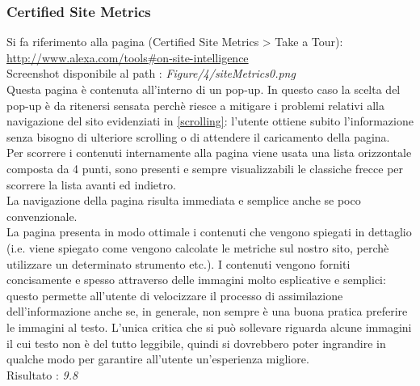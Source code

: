 \subsubsection{Certified Site Metrics}\label{metrics}
Si fa riferimento alla pagina (Certified Site Metrics > Take a Tour): \\
\url{http://www.alexa.com/tools#on-site-intelligence}
\\
Screenshot disponibile al path : \textit{Figure/4/siteMetrics0.png} \\ 
Questa pagina è contenuta all'interno di un pop-up.
In questo caso la scelta del pop-up è da ritenersi sensata perchè riesce a 
mitigare i problemi relativi alla navigazione del sito evidenziati in 
\ref{scrolling}: l'utente ottiene subito l'informazione senza
bisogno di ulteriore scrolling o di attendere il caricamento della pagina.\\
Per scorrere i contenuti internamente alla pagina viene usata una lista
 orizzontale composta da 4 punti, sono presenti e sempre
visualizzabili le classiche frecce per scorrere la lista avanti ed indietro. \\
La navigazione della pagina risulta immediata e semplice anche se poco
convenzionale. \\
La pagina presenta in modo ottimale i contenuti che vengono spiegati in 
dettaglio (i.e. viene spiegato come vengono calcolate le metriche sul
nostro sito, perchè utilizzare un determinato strumento etc.). I contenuti vengono
forniti concisamente e spesso attraverso delle immagini molto esplicative e
semplici: questo permette all'utente di velocizzare il processo di assimilazione
dell'informazione anche se, in generale, non sempre è una buona pratica 
preferire le immagini al testo. L'unica critica che si può sollevare riguarda
alcune immagini il cui testo non è del tutto leggibile, quindi si dovrebbero
poter ingrandire in qualche modo per garantire all'utente un'esperienza migliore.
 \\
Risultato : \textit{9.8}
